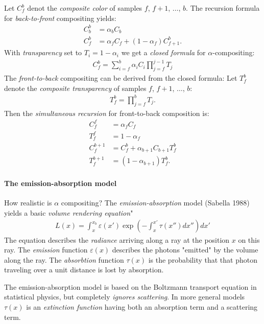 Let $C_f^b$ denot the \emph{composite color} of samples $f$, $f+1$, $\ldots$, $b$. The recursion formula for \emph{back-to-front} compositing yields:
\begin{align*}
    C_b^b &= \alpha_b C_b\\
    C_f^b &= \alpha_f C_f + (1-\alpha_f)C_{f+1}^b.
\end{align*}
With \emph{transparency} set to $T_i = 1-\alpha_i$ we get a \emph{closed formula} for $\alpha$-compositing:
\begin{align*}
    C_f^b = \sum_{i=f}^b \alpha_i C_i \prod_{j=f}^{j-1} T_j
\end{align*}
The \emph{front-to-back} compositing can be derived from the closed formula: Let $T_f^b$ denote the \emph{composite transparency} of samples $f$, $f+1$, $\ldots$, $b$:
\begin{align*}
    T_f^b = \prod_{j=f}^b T_j.
\end{align*}
Then the \emph{simultaneous recursion} for front-to-back composition is:
\begin{align*}
    C_f^f &= \alpha_f C_f\\
    T_f^f &= 1-\alpha_f\\
    C_f^{b+1} &= C_f^b + \alpha_{b+1} C_{b+1} T_f^b\\
    T_f^{b+1} &= (1-\alpha_{b+1})T_f^b.
\end{align*}

\paragraph{The emission-absorption model} How realistic is $\alpha$ compositing? The \emph{emission-absorption} model (Sabella 1988) yields a basic \emph{volume rendering equation}"
\begin{align*}
    L(x) = \int_x^{x_b} \varepsilon (x') \exp\left( -\int_x^{x'} \tau (x'') dx''\right) dx'
\end{align*}
The equation describes the \emph{radiance} arriving along a ray at the position $x$ on this ray. The \emph{emission} function $\varepsilon(x)$ describes the photons "emitted" by the volume along the ray. The \emph{absorbtion} function $\tau(x)$ is the probability that that photon traveling over a unit distance is lost by absorption.


The emission-absorption model is based on the Boltzmann transport equation in statistical physics, but completely \emph{ignores scattering}. In more general models $\tau(x)$ is an \emph{extinction function} having both an absorption term and a scattering term.

